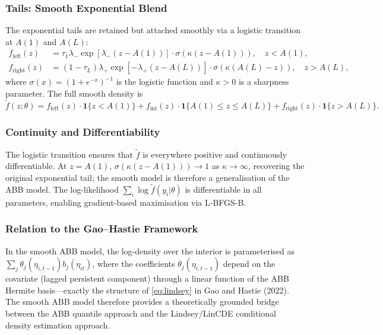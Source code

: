 \documentclass[12pt]{article}
\begin{document}
\subsubsection*{Tails: Smooth Exponential Blend}

The exponential tails are retained but attached smoothly via a logistic
transition at $A(1)$ and $A(L)$:
\begin{align}
f_{\text{left}}(z) &= \tau_1\lambda_-\exp[\lambda_-(z-A(1))]\cdot\sigma(\kappa(z-A(1))),
\quad z<A(1),\\
f_{\text{right}}(z) &= (1-\tau_L)\lambda_+\exp[-\lambda_+(z-A(L))]\cdot\sigma(\kappa(A(L)-z)),
\quad z>A(L),
\end{align}
where $\sigma(x)=(1+e^{-x})^{-1}$ is the logistic function and $\kappa>0$ is
a sharpness parameter.
The full smooth density is
\begin{equation}\label{eq:smooth_full}
\tilde f(z;\theta)=f_{\text{left}}(z)\cdot\mathbf{1}\{z<A(1)\}
+f_{\text{int}}(z)\cdot\mathbf{1}\{A(1)\le z\le A(L)\}
+f_{\text{right}}(z)\cdot\mathbf{1}\{z>A(L)\}.
\end{equation}

\subsubsection*{Continuity and Differentiability}

The logistic transition ensures that $\tilde f$ is everywhere positive and
continuously differentiable.
At $z=A(1)$, $\sigma(\kappa(z-A(1)))\to1$ as $\kappa\to\infty$, recovering
the original exponential tail; the smooth model is therefore a generalisation
of the ABB model.
The log-likelihood $\sum_i\log\tilde f(y_i|\theta)$ is differentiable in all
parameters, enabling gradient-based maximisation via L-BFGS-B.

\subsubsection*{Relation to the Gao--Hastie Framework}

In the smooth ABB model, the log-density over the interior is parameterised
as $\sum_j\theta_j(\eta_{i,t-1})b_j(\eta_{it})$, where the coefficients
$\theta_j(\eta_{i,t-1})$ depend on the covariate (lagged persistent component)
through a linear function of the ABB Hermite basis---exactly the structure
of \eqref{eq:lindsey} in Gao and Hastie (2022).
The smooth ABB model therefore provides a theoretically grounded bridge
between the ABB quantile approach and the Lindsey/LinCDE conditional density
estimation approach.
\end{document}
